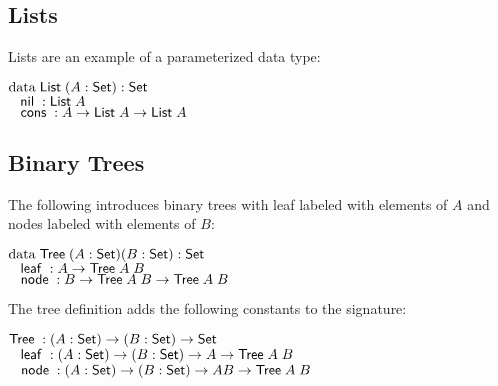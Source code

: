 \subsection{Lists}
Lists are an example of a parameterized data type:
\begin{bsp}
$\data \List ( A : \Set ) : \Set $ \\
$ \spc \nil : \List A  $\\
$ \spc \cons : A \ra \List A \ra \List A $
\end{bsp}
\subsection{Binary Trees}
The following introduces binary trees with leaf labeled with elements of $A$ and nodes labeled with elements of $B$:
\begin{bsp}
$\data \Tree ( A : \Set ) ( B : \Set ) : \Set $ \\
$ \spc \leaf : A \ra \Tree A \; B $\\
$ \spc \node : B \ra \Tree A \; B \ra \Tree A \; B $
\end{bsp}
The tree definition adds the following constants to the signature:
\begin{bsp}
$\Tree  : ( A : \Set ) \ra ( B : \Set ) \ra \Set$ \\
$ \spc \leaf : ( A : \Set ) \ra ( B : \Set ) \ra A \ra \Tree A \; B $ \\
$ \spc \node : ( A : \Set ) \ra ( B : \Set ) \ra A B \ra \Tree A \; B $
\end{bsp}
